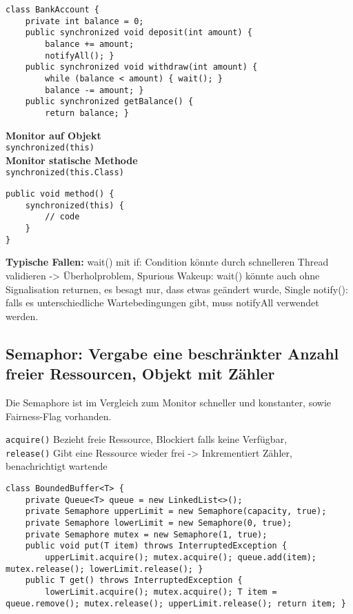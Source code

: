 \begin{minipage}[t]{0.75\linewidth}
\begin{lstlisting}[style=java]
class BankAccount {
	private int balance = 0;
	public synchronized void deposit(int amount) {
		balance += amount;
		notifyAll(); }
	public synchronized void withdraw(int amount) {
		while (balance < amount) { wait(); }
		balance -= amount; }
	public synchronized getBalance() {
		return balance; }
\end{lstlisting}	
\end{minipage}
\begin{minipage}[t]{0.25\linewidth}
	\textbf{Monitor auf Objekt} \\ \lstinline|synchronized(this)| \\
	\textbf{Monitor statische Methode} \\ \lstinline|synchronized(this.Class)|
	
\begin{lstlisting}[style=java]
public void method() {
	synchronized(this) {
		// code
	}
}
\end{lstlisting}
\end{minipage}

\textbf{Typische Fallen:} wait() mit if: Condition könnte durch schnelleren Thread validieren -> Überholproblem, Spurious Wakeup: wait() könnte auch ohne Signalisation returnen, es besagt nur, dass etwas geändert wurde, Single notify(): falls es unterschiedliche Wartebedingungen gibt, muss notifyAll verwendet werden.

\subsection{Semaphor: Vergabe eine beschränkter Anzahl freier Ressourcen, Objekt mit Zähler}
Die Semaphore ist im Vergleich zum Monitor schneller und konstanter, sowie Fairness-Flag vorhanden.

\lstinline|acquire()| Bezieht freie Ressource, Blockiert falls keine Verfügbar, \\
\lstinline|release()| Gibt eine Ressource wieder frei -> Inkrementiert Zähler, benachrichtigt wartende

\begin{lstlisting}[style=java]
class BoundedBuffer<T> {
	private Queue<T> queue = new LinkedList<>();
	private Semaphore upperLimit = new Semaphore(capacity, true);
	private Semaphore lowerLimit = new Semaphore(0, true);
	private Semaphore mutex = new Semaphore(1, true);
	public void put(T item) throws InterruptedException {
		upperLimit.acquire(); mutex.acquire(); queue.add(item); mutex.release(); lowerLimit.release(); }
	public T get() throws InterruptedException {
		lowerLimit.acquire(); mutex.acquire(); T item = queue.remove(); mutex.release(); upperLimit.release(); return item; }
\end{lstlisting}

